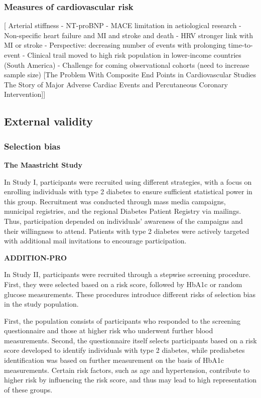 \documentclass[
  a4paper,
  headsepline=true,
  open=any]{scrbook}
\begin{document}
\hypertarget{measures-of-cardiovascular-risk}{%
\subsubsection{Measures of cardiovascular
risk}\label{measures-of-cardiovascular-risk}}

{[} Arterial stiffness - NT-proBNP - MACE limitation in aetiological
research - Non-specific heart failure and MI and stroke and death - HRV
stronger link with MI or stroke - Perspective: decreasing number of
events with prolonging time-to-event - Clinical trail moved to high risk
population in lower-income countries (South America) - Challenge for
coming observational cohorts (need to increase sample size) {[}The
Problem With Composite End Points in Cardiovascular Studies The Story of
Major Adverse Cardiac Events and Percutaneous Coronary
Intervention{]}{]}

\hypertarget{external-validity}{%
\subsection{External validity}\label{external-validity}}

\hypertarget{selection-bias}{%
\subsubsection{Selection bias}\label{selection-bias}}

\textbf{The Maastricht Study}

In Study I, participants were recruited using different strategies, with
a focus on enrolling individuals with type 2 diabetes to ensure
sufficient statistical power in this group. Recruitment was conducted
through mass media campaigns, municipal registries, and the regional
Diabetes Patient Registry via mailings. Thus, participation depended on
individuals' awareness of the campaigns and their willingness to attend.
Patients with type 2 diabetes were actively targeted with additional
mail invitations to encourage participation.

\textbf{ADDITION-PRO}

In Study II, participants were recruited through a stepwise screening
procedure. First, they were selected based on a risk score, followed by
HbA1c or random glucose measurements. These procedures introduce
different risks of selection bias in the study population.

First, the population consists of participants who responded to the
screening questionnaire and those at higher risk who underwent further
blood measurements. Second, the questionnaire itself selects
participants based on a risk score developed to identify individuals
with type 2 diabetes, while prediabetes identification was based on
further measurement on the basis of HbA1c measurements. Certain risk
factors, such as age and hypertension, contribute to higher risk by
influencing the risk score, and thus may lead to high representation of
these groups.
\end{document}
